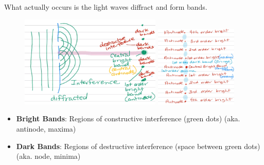 \documentclass[a4paper,12pt]{article}
\begin{document}
What actually occurs is the light waves diffract and form bands.
\begin{figure}[H]
    \centering
    \includegraphics[width=0.6\textwidth]{experiment-2}
    \includegraphics[width=0.35\textwidth]{experiment-3}
\end{figure}
\begin{itemize}
    \item{\textbf{Bright Bands}: Regions of constructive interference (green dots) (aka. antinode, maxima)}
    \item{\textbf{Dark Bands}: Regions of destructive interference (space between green dots) (aka. node, minima)}
\end{itemize}
\end{document}
